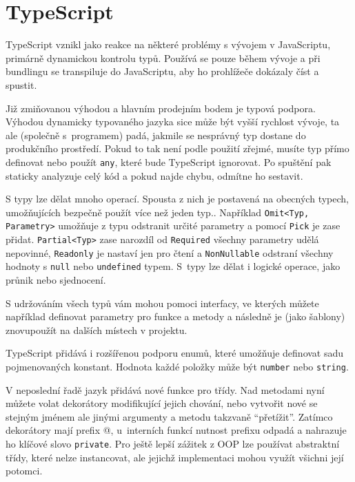 \section{TypeScript}

TypeScript vznikl jako reakce na některé problémy s vývojem v JavaScriptu, primárně dynamickou kontrolu typů. Používá se pouze během vývoje a při bundlingu se transpiluje do JavaScriptu, aby ho prohlížeče dokázaly číst a spustit.

Již zmiňovanou výhodou a hlavním prodejním bodem je typová podpora. Výhodou dynamicky typovaného jazyka sice může být vyšší rychlost vývoje, ta ale (společně s~programem) padá, jakmile se nesprávný typ dostane do produkčního prostředí. Pokud to tak není podle použití zřejmé, musíte typ přímo definovat nebo použít \texttt{any}, které bude TypeScript ignorovat. Po spuštění pak staticky analyzuje celý kód a pokud najde chybu, odmítne ho sestavit.

S typy lze dělat mnoho operací. Spousta z nich je postavená na obecných typech, umožňujících bezpečně použít více než jeden typ.\cite{TSGenerics}. Například \texttt{Omit<Typ, Parametry>} umožňuje z typu odstranit určité parametry a pomocí \texttt{Pick} je zase přidat. \texttt{Partial<Typ>} zase narozdíl od \texttt{Required} všechny parametry udělá nepovinné, \texttt{Readonly} je nastaví jen pro čtení a \texttt{NonNullable} odstraní všechny hodnoty s \texttt{null} nebo \texttt{undefined} typem. S~typy lze dělat i logické operace, jako průnik nebo sjednocení.

S udržováním všech typů vám mohou pomoci interfacy, ve kterých můžete například definovat parametry pro funkce a metody a následně je (jako šablony) znovupoužít na dalších místech v projektu.

TypeScript přidává i rozšířenou podporu enumů, které umožňuje definovat sadu pojmenovaných konstant. Hodnota každé položky může být \texttt{number} nebo \texttt{string}.\cite{WhatIsAnEnum}

V neposlední řadě jazyk přidává nové funkce pro třídy. Nad metodami nyní můžete volat dekorátory modifikující jejich chování, nebo vytvořit nové se stejným jménem ale jinými argumenty a metodu takzvaně \enquote{přetížit}. Zatímco dekorátory mají prefix @, u~interních funkcí nutnost prefixu odpadá a nahrazuje ho klíčové slovo \texttt{private}. Pro ještě lepší zážitek z OOP lze používat abstraktní třídy, které nelze instancovat, ale jejichž implementaci mohou využít všichni její potomci.
